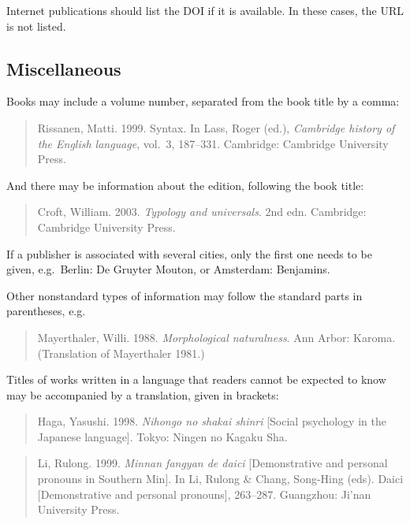 \documentclass[a4paper]{article}
\newenvironment{gsrexq}{\begin{quote}\color{blue}}{\end{quote}}
\newcommand{\gsrex}[1]{{\color{blue}#1}}
\begin{document}
Internet publications should list the DOI if it is available. In these cases, the URL is not listed. 

\subsection{Miscellaneous}\label{sec:miscellaneous}

Books may include a volume number, separated from the book title by a
comma: 

\begin{gsrexq}
Rissanen, Matti. 1999. Syntax. In Lass, Roger (ed.), \textit{Cambridge history of the English language}, vol.~3, 187--331. 
Cambridge: Cambridge University Press. 
\end{gsrexq}

And there may be information about the edition,
following the book title: 

\begin{gsrexq}
Croft, William. 2003. \textit{Typology and universals}.
2nd edn. Cambridge: Cambridge University Press.
\end{gsrexq}

If a publisher is
associated with several cities, only the first one needs to be given,
e.g.~\gsrex{Berlin: De Gruyter Mouton}, or \gsrex{Amsterdam: Benjamins}.

Other
nonstandard types of information may follow the standard parts in
parentheses, e.g.~

\begin{gsrexq}
Mayerthaler, Willi. 1988. \textit{Morphological naturalness}.
Ann Arbor: Karoma. (Translation of Mayerthaler 1981.)
\end{gsrexq}

Titles of works
written in a language that readers cannot be expected to know may be
accompanied by a translation, given in brackets: 


\begin{gsrexq}
Haga, Yasushi. 1998.
\textit{Nihongo no shakai shinri} [Social psychology in the Japanese
language]. Tokyo: Ningen no Kagaku Sha.
\end{gsrexq}


\begin{gsrexq}
Li, Rulong. 1999. \textit{Minnan fangyan de daici} 
[Demonstrative and personal pronouns in Southern Min]. 
In Li, Rulong \& Chang, Song-Hing (eds). 
Daici [Demonstrative and personal pronouns], 263--287. 
Guangzhou: Ji'nan University Press.
\end{gsrexq}
\end{document}
